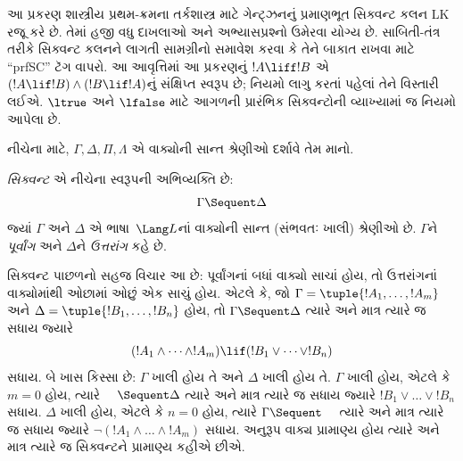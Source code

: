 \OLEndChapterHook
\endgroup


%
  \begingroup
\makeatletter{}\makeatother

\label{guunit:OLP-0069}

\begin{editorial}
  આ પ્રકરણ શાસ્ત્રીય પ્રથમ-ક્રમના તર્કશાસ્ત્ર માટે ગેન્ટ્ઝનનું પ્રમાણભૂત
  સિક્વન્ટ કલન LK રજૂ કરે છે. તેમાં હજી વધુ દાખલાઓ અને
  અભ્યાસપ્રશ્નો ઉમેરવા યોગ્ય છે. સાબિતી-તંત્ર તરીકે સિક્વન્ટ કલનને લાગતી
  સામગ્રીનો સમાવેશ કરવા કે તેને બાકાત રાખવા માટે ``prfSC'' ટૅગ વાપરો.
આ આવૃત્તિમાં આ પ્રકરણનું $!A\liff!B$ એ
$(!A\lif!B)\land(!B\lif!A)$નું સંક્ષિપ્ત સ્વરૂપ છે; નિયમો લાગુ
કરતાં પહેલાં તેને વિસ્તારી લઈએ. $\ltrue$ અને $\lfalse$ માટે
આગળની પ્રારંભિક સિક્વન્ટોની વ્યાખ્યામાં જ નિયમો આપેલા છે.
\end{editorial}

\begingroup
\makeatletter{}\makeatother


\label{guunit:OLP-0070}


નીચેના માટે, $\Gamma, \Delta, \Pi, \Lambda$ એ વાક્યોની સાન્ત
શ્રેણીઓ દર્શાવે તેમ માનો.

\begin{defn}[સિક્વન્ટ]
\emph{સિક્વન્ટ} એ નીચેના સ્વરૂપની અભિવ્યક્તિ છે:
\[
\Gamma \Sequent \Delta
\]
જ્યાં $\Gamma$ અને $\Delta$ એ ભાષા~$\Lang L$નાં વાક્યોની સાન્ત
(સંભવતઃ ખાલી) શ્રેણીઓ છે. $\Gamma$ને \emph{પૂર્વાંગ} અને $\Delta$ને
\emph{ઉત્તરાંગ} કહે છે.
\end{defn}

\begin{explain}
સિક્વન્ટ પાછળનો સહજ વિચાર આ છે: પૂર્વાંગનાં બધાં વાક્યો સાચાં હોય,
તો ઉત્તરાંગનાં વાક્યોમાંથી ઓછામાં ઓછું એક સાચું હોય. એટલે કે, જો
$\Gamma = \tuple{!A_1, \dots, !A_m}$ અને
$\Delta = \tuple{!B_1, \dots, !B_n}$ હોય, તો
$\Gamma \Sequent \Delta$ ત્યારે અને માત્ર ત્યારે જ સધાય જ્યારે
\[
(!A_1 \land \cdots \land !A_m) \lif (!B_1 \lor \cdots \lor
!B_n)
\]
સધાય. બે ખાસ કિસ્સા છે: $\Gamma$ ખાલી હોય તે અને $\Delta$ ખાલી હોય તે.
$\Gamma$ ખાલી હોય, એટલે કે $m = 0$ હોય, ત્યારે $\quad \Sequent \Delta$
ત્યારે અને માત્ર ત્યારે જ સધાય જ્યારે $!B_1 \lor \dots \lor !B_n$
સધાય. $\Delta$ ખાલી હોય, એટલે કે $n = 0$ હોય, ત્યારે
$\Gamma \Sequent \quad$ ત્યારે અને માત્ર ત્યારે જ સધાય જ્યારે
$\lnot(!A_1 \land \dots \land !A_m)$ સધાય. અનુરૂપ વાક્ય
પ્રામાણ્ય હોય ત્યારે અને માત્ર ત્યારે જ સિક્વન્ટને પ્રામાણ્ય કહીએ છીએ.
\end{explain}


